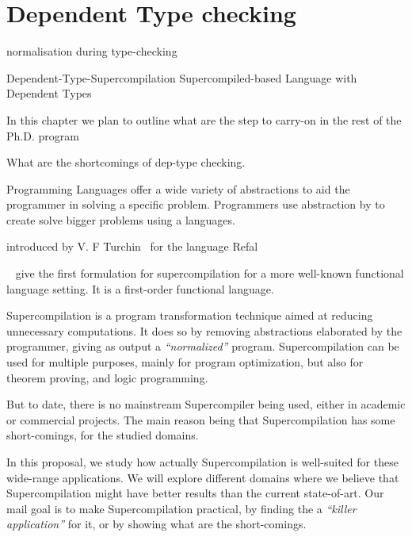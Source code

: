\section{Dependent Type checking}

normalisation during type-checking



Dependent-Type-Supercompilation
Supercompiled-based Language with Dependent Types




In this chapter we plan to outline what are the step to carry-on in the rest of the Ph.D. program

What are the shortcomings of dep-type checking.





Programming Languages offer a wide variety of abstractions to aid the programmer in solving a specific problem.
Programmers use abstraction by to create solve bigger problems
using a languages.

introduced by V. F Turchin~\cite{Turchin:1986:CS:5956.5957}
for the language Refal

~\cite{sorm94} give the first formulation for supercompilation for a more well-known functional language setting.
It is a first-order functional language.


Supercompilation is a program transformation technique aimed at reducing unnecessary computations.
It does so by removing abstractions elaborated by the programmer, giving as output a \emph{``normalized''} program.
Supercompilation can be used for multiple purposes, mainly for program optimization, but also for theorem proving, and logic programming.

But to date, there is no mainstream Supercompiler being used, either in academic or commercial projects.
The main reason being that Supercompilation has some short-comings, for the studied domains.

In this proposal, we study how actually Supercompilation is well-suited for these wide-range applications.
We will explore different domains where we believe that Supercompilation might have better results than the current state-of-art.
Our mail goal is to make Supercompilation practical, by finding the a \emph{``killer application''} for it, or by showing what are the short-comings.





